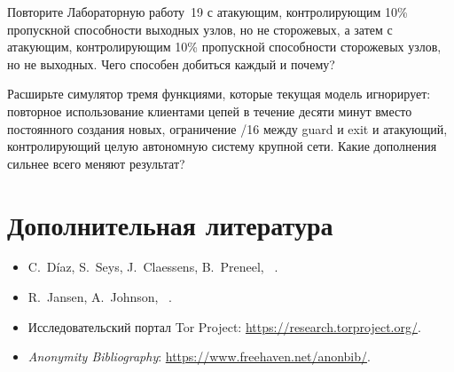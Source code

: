 \begin{esercizio}[2]\label{es:29-asimmetria}
Повторите Лабораторную работу~19 с атакующим, контролирующим 10\% пропускной способности выходных узлов, но не сторожевых, а затем с атакующим, контролирующим 10\% пропускной способности сторожевых узлов, но не выходных. Чего способен добиться каждый и почему?
\end{esercizio}

\begin{esercizio}[3]\label{es:29-torps}
Расширьте симулятор тремя функциями, которые текущая модель игнорирует: повторное использование клиентами цепей в течение десяти минут вместо постоянного создания новых, ограничение /16 между guard и exit и атакующий, контролирующий целую автономную систему крупной сети. Какие дополнения сильнее всего меняют результат?
\end{esercizio}

\section*{Дополнительная литература}
\begin{itemize}
  \item C.~Díaz, S.~Seys, J.~Claessens, B.~Preneel, ~\cite{diaz2002measuring}.
  \item R.~Jansen, A.~Johnson, ~\cite{jansen2016privcount}.
  \item Исследовательский портал Tor Project: \url{https://research.torproject.org/}.
  \item \emph{Anonymity Bibliography}: \url{https://www.freehaven.net/anonbib/}.
\end{itemize}

